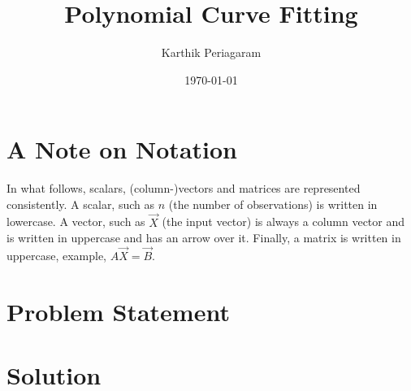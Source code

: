\documentclass{article}
\title{Polynomial Curve Fitting}
\author{Karthik Periagaram}
\date{\today}
\begin{document}
\maketitle

\section{A Note on Notation}

In what follows, scalars, (column-)vectors and matrices are represented consistently.
A scalar, such as \(n\) (the number of observations) is written in lowercase.
A vector, such as \(\vec{X}\) (the input vector) is always a column vector and is written in uppercase and has an arrow over it.
Finally, a matrix is written in uppercase, example, \(A\vec{X}=\vec{B}\).

\section{Problem Statement}

\section{Solution}




\end{document}
